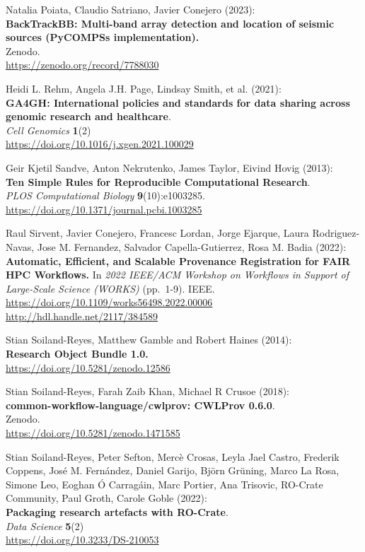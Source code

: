 \documentclass[10pt,letterpaper]{article}
\begin{document}
\begin{thebibliography}{10}
 Natalia Poiata, Claudio Satriano, Javier Conejero
(2023):\\
\textbf{BackTrackBB: Multi-band array detection and location of seismic
sources (PyCOMPSs implementation).}\\
Zenodo.\\
\url{https://zenodo.org/record/7788030}

 Heidi L. Rehm, Angela J.H. Page, Lindsay Smith, et al.
(2021):\\
\textbf{GA4GH: International policies and standards for data sharing
across genomic research and healthcare}.\\
\emph{Cell Genomics} \textbf{1}(2)\\
\url{https://doi.org/10.1016/j.xgen.2021.100029}

 Geir Kjetil Sandve, Anton Nekrutenko, James Taylor,
Eivind Hovig (2013):\\
\textbf{Ten Simple Rules for Reproducible Computational Research}.\\
\emph{PLOS Computational Biology} \textbf{9}(10):e1003285.\\
\url{https://doi.org/10.1371/journal.pcbi.1003285}

 Raul Sirvent, Javier Conejero, Francesc Lordan, Jorge
Ejarque, Laura Rodriguez-Navas, Jose M. Fernandez, Salvador
Capella-Gutierrez, Rosa M. Badia (2022):\\
\textbf{Automatic, Efficient, and Scalable Provenance Registration for
FAIR HPC Workflows.} In \emph{2022 IEEE/ACM Workshop on Workflows in
Support of Large-Scale Science (WORKS)} (pp.~1-9). IEEE.\\
\url{https://doi.org/10.1109/works56498.2022.00006}\\
\url{http://hdl.handle.net/2117/384589}

 Stian Soiland-Reyes, Matthew Gamble and Robert
Haines (2014):\\
\textbf{Research Object Bundle 1.0.}\\
\url{https://doi.org/10.5281/zenodo.12586}

 Stian Soiland-Reyes, Farah Zaib Khan, Michael R
Crusoe (2018):\\
\textbf{common-workflow-language/cwlprov: CWLProv 0.6.0}.\\
Zenodo.\\
\url{https://doi.org/10.5281/zenodo.1471585}

 Stian Soiland-Reyes, Peter Sefton, Mercè
Crosas, Leyla Jael Castro, Frederik Coppens, José M. Fernández, Daniel
Garijo, Björn Grüning, Marco La Rosa, Simone Leo, Eoghan Ó Carragáin,
Marc Portier, Ana Trisovic, RO-Crate Community, Paul Groth, Carole Goble
(2022):\\
\textbf{Packaging research artefacts with RO-Crate}.\\
\emph{Data Science} \textbf{5}(2)\\
\url{https://doi.org/10.3233/DS-210053}


\end{thebibliography}
\end{document}
